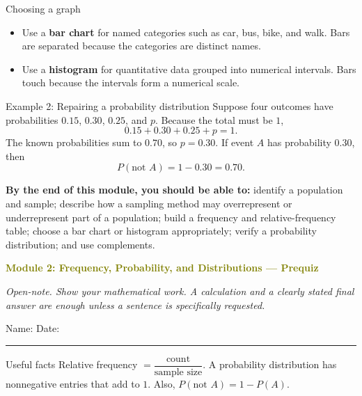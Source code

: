 \documentclass[11pt]{article}
\newcommand{\prequizhead}[2]{%
  \clearpage
  {\Large\bfseries\textcolor{olive}{Module #1: #2 — Prequiz}}\par
  \textit{Open-note. Show your mathematical work. A calculation and a clearly stated final answer are enough unless a sentence is specifically requested.}\par
  Name: \hspace{2.6in} Date: \hspace{1.1in}\par
  \vspace{2pt}\textcolor{gold}{\rule{\linewidth}{1.2pt}}\par\smallskip
}
\begin{document}
\begin{keybox}{Choosing a graph}
\begin{itemize}
\item Use a \textbf{bar chart} for named categories such as car, bus, bike, and walk. Bars are separated because the categories are distinct names.
\item Use a \textbf{histogram} for quantitative data grouped into numerical intervals. Bars touch because the intervals form a numerical scale.
\end{itemize}
\end{keybox}

\begin{examplebox}{Example 2: Repairing a probability distribution}
Suppose four outcomes have probabilities \(0.15\), \(0.30\), \(0.25\), and \(p\). Because the total must be \(1\),
\[
0.15+0.30+0.25+p=1.
\]
The known probabilities sum to \(0.70\), so \(p=0.30\). If event \(A\) has probability \(0.30\), then
\[
P(\text{not }A)=1-0.30=0.70.
\]
\end{examplebox}

\textbf{By the end of this module, you should be able to:} identify a population and sample; describe how a sampling method may overrepresent or underrepresent part of a population; build a frequency and relative-frequency table; choose a bar chart or histogram appropriately; verify a probability distribution; and use complements.

\prequizhead{2}{Frequency, Probability, and Distributions}
\begin{refbox}{Useful facts}
Relative frequency \(=\dfrac{\text{count}}{\text{sample size}}\). A probability distribution has nonnegative entries that add to \(1\). Also, \(P(\text{not }A)=1-P(A)\).
\end{refbox}
\end{document}
